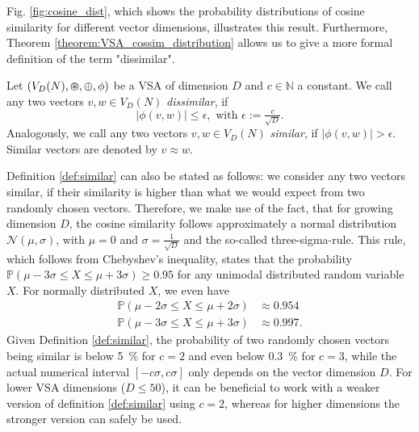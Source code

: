 Fig. \ref{fig:cosine_dist}, which shows the probability distributions of cosine similarity for different vector dimensions, illustrates this result.
Furthermore, Theorem \ref{theorem:VSA_cossim_distribution} allows us to give a more formal definition of the term "dissimilar".
\begin{defn}
	\label{def:similar}
	Let $(V_{D}(N), \varoast, \oplus, \phi)$ be a \acrfull{VSA} of dimension $D$ and $c \in \mathbb{N}$ a constant. We call any two vectors $v, w \in V_{D}(N)$ \emph{dissimilar}, if
	\[
	\left| \phi(v,w) \right| \leq \epsilon, \textrm{ with } \epsilon:=\tfrac{c}{\sqrt{D}}.
	\]
	Analogously, we call any two vectors $v, w \in V_{D}(N)$ \emph{similar}, if	$\left| \phi(v,w) \right| > \epsilon$.
	Similar vectors are denoted by $v \approx w$. \\
\end{defn}
Definition \ref{def:similar} can also be stated as follows: we consider any two vectors similar, if their similarity is higher than what we would expect from two randomly chosen vectors.
Therefore, we make use of the fact, that for growing dimension $D$, the cosine similarity follows approximately a normal distribution $\mathcal{N}\left(\mu, \sigma\right)$, with $\mu=0$ and $\sigma=\tfrac{1}{\sqrt{D}}$ and the so-called three-sigma-rule.
This rule, which follows from Chebyshev's inequality, states that the probability $\mathbb{P}\left(\mu-3\sigma \leq X \leq \mu+3\sigma \right) \geq 0.95$ for any unimodal distributed random variable $X$.
For normally distributed $X$, we even have
\begin{align*}
	\mathbb{P}\left(\mu-2\sigma \leq X \leq \mu+2\sigma \right) &\approx 0.954 \\
	\mathbb{P}\left(\mu-3\sigma \leq X \leq \mu+3\sigma \right) &\approx 0.997.
\end{align*}
Given Definition \ref{def:similar}, the probability of two randomly chosen vectors being similar is below \SI{5}{\percent} for $c=2$ and even below \SI{0.3}{\percent} for $c=3$, while the actual numerical interval $\left[-c\sigma, c\sigma\right]$ only depends on the vector dimension $D$.
For lower \ac{VSA} dimensions ($D \leq 50$), it can be beneficial to work with a weaker version of definition \ref{def:similar} using $c=2$, whereas for higher dimensions the stronger version can safely be used. 

